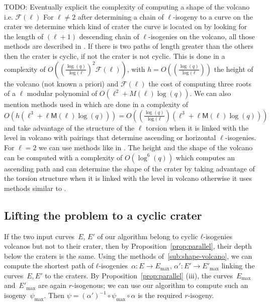 \documentclass{lms}
\newcommand{\todo}[1]{{\color{red}TODO: #1}}
\begin{document}
\todo{Eventually explicit the complexity of computing a shape of the volcano i.e. $\mathcal{F}(\ell)$}
  For $\ell \neq 2$ after determining a chain of $\ell$-isogeny to a curve on the crater we determine which kind of crater the curve is located on by looking for  the length of $(\ell+1)$ descending chain of $\ell$-isogenies on the volcano, all those methods are described in \cite{volcano}. If there is two paths of length greater than the others then the crater is cyclic, if not the crater is not cyclic. This is done in a complexity of $O( ( \frac{\log(q)}{\log(\ell})^2 \mathcal{F}(\ell) )$, with $h=O(( \frac{\log(q)}{\log(\ell}))$ the height of the volcano (not known a priori) and $\mathcal{F}(\ell)$ the cost of computing three roots of a $\ell$ modular polynomial of $O(\ell^2+M(\ell)\log(q))$. We can also mention methods used in \cite{IonicaJ10} which are done in a complexity of $O(h(\ell^3+\ell \mathsf{M}(\ell) \log(q)))=O(( \frac{\log(q)}{\log(\ell})(\ell^3+\ell \mathsf{M}(\ell) \log(q)))$ and take advantage of the structure of the $\ell$ torsion when it is linked with the level in volcano with pairings that determine ascending or horizontal $\ell$-isogenies. %
\newline 
For $\ell=2$ we can use methods like in \cite{MiretMRV05}. The height and the shape of the volcano can be computed with a complexity of $O(\log^6(q))$ which computes an ascending path and can determine the shape of the crater by taking advantage of the torsion structure when it is linked with the level in volcano otherwise it uses methods similar to \cite{volcano}.
  
\subsection{Lifting the problem to a cyclic crater}

If the two input curves~$E$, $E'$ of our algorithm
belong to cyclic $ℓ$-isogenies volcanos but not to their crater,
then by Proposition~\ref{prop:parallel},
their depth below the craters is the same.
Using the methods of~\ref{sub:shape-volcano},
we can compute the shortest path of $ℓ$-isogenies~$α: E → E_{\max}$,
$α': E' → E'_{\max}$ linking the curves~$E, E'$ to the craters.
By Proposition~\ref{prop:parallel} (iii),
the curves~$E_{\max}$ and~$E'_{\max}$ are again $r$-isogenous;
we can use our algorithm to compute such an isogeny~$ψ_{\max}$.
Then $ψ = (α')^{-1} ∘ ψ_{\max} ∘ α$ is the required $r$-isogeny.
\end{document}
